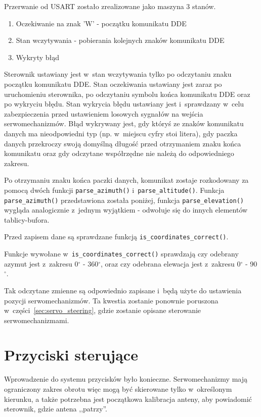 \documentclass[eng,oneside]{mgr}
\begin{document}
			Przerwanie od USART zostało zrealizowane jako maszyna 3 stanów.
			\begin{enumerate}
				\item Oczekiwanie na znak 'W' - początku komunikatu DDE
				\item Stan wczytywania - pobierania kolejnych znaków komunikatu DDE
				\item Wykryty błąd
			\end{enumerate}
			Sterownik ustawiany jest w~stan wczytywania tylko po odczytaniu znaku początku komunikatu DDE. Stan oczekiwania ustawiany jest zaraz po uruchomieniu sterownika, po odczytaniu symbolu końca komunikatu DDE oraz po wykryciu błędu. Stan wykrycia błędu ustawiany jest i~sprawdzany w~celu zabezpieczenia przed ustawieniem losowych sygnałów na wejścia serwomechanizmów. Błąd wykrywany jest, gdy któryś ze znaków komunikatu danych ma nieodpowiedni typ (np. w~miejscu cyfry stoi litera), gdy paczka danych przekroczy swoją domyślną długość przed otrzymaniem znaku końca komunikatu oraz gdy odczytane współrzędne nie należą do odpowiedniego zakresu.

			Po otrzymaniu znaku końca paczki danych, komunikat zostaje rozkodowany za pomocą dwóch funkcji \texttt{parse\_azimuth()} i~\texttt{parse\_altitude()}. Funkcja \texttt{parse\_azimuth()} przedstawiona została poniżej, funkcja \texttt{parse\_elevation()} wygląda analogicznie z~jednym wyjątkiem - odwołuje się do innych elementów tablicy-bufora.

			

			Przed zapisem dane są sprawdzane funkcją \texttt{is\_coordinates\_correct()}.
			

			Funkcje wywołane w~\texttt{is\_coordinates\_correct()} sprawdzają czy odebrany azymut jest z~zakresu 0$^{\circ}$ - 360$^{\circ}$, oraz czy odebrana elewacja jest z~zakresu 0$^{\circ}$ - 90$^{\circ}$.

			Tak odczytane zmienne są odpowiednio zapisane i~będą użyte do ustawienia pozycji serwomechanizmów. Ta kwestia zostanie ponownie poruszona w~części~\ref{sec:servo_steering}, gdzie zostanie opisane sterowanie serwomechanizmami. 

		\section{Przyciski sterujące}
		Wprowadzenie do systemu przycisków było konieczne. Serwomechanizmy mają ograniczony zakres obrotu więc mogą być skierowane tylko w~określonym kierunku, a także potrzebna jest początkowa kalibracja anteny, aby powiadomić sterownik, gdzie antena ,,patrzy''.
\end{document}
